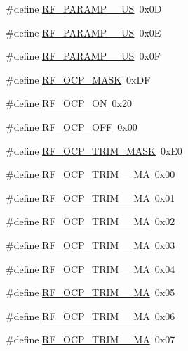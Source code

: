 \begin{DoxyCompactItemize}
\#define \mbox{\hyperlink{sx1276_regs-_fsk_8h_a035bf0812a1b3171b3ca7ccebfe71deb}{R\+F\+\_\+\+P\+A\+R\+A\+M\+P\+\_\+\_\+\+US}}~0x0D
\item 
\#define \mbox{\hyperlink{sx1276_regs-_fsk_8h_abca7fd114ba58b4640c3662519e2c713}{R\+F\+\_\+\+P\+A\+R\+A\+M\+P\+\_\+\_\+\+US}}~0x0E
\item 
\#define \mbox{\hyperlink{sx1276_regs-_fsk_8h_a7863d94d5d9cbd4b3fa8ba21da2c1d2d}{R\+F\+\_\+\+P\+A\+R\+A\+M\+P\+\_\+\_\+\+US}}~0x0F
\item 
\#define \mbox{\hyperlink{sx1276_regs-_fsk_8h_a647861589ac95c5f1dc957e8050efd1c}{R\+F\+\_\+\+O\+C\+P\+\_\+\+M\+A\+SK}}~0x\+DF
\item 
\#define \mbox{\hyperlink{sx1276_regs-_fsk_8h_a88bfe34637e386be3c38ce7ff1a9eed1}{R\+F\+\_\+\+O\+C\+P\+\_\+\+ON}}~0x20
\item 
\#define \mbox{\hyperlink{sx1276_regs-_fsk_8h_adcad32407684d268946ce3928213a966}{R\+F\+\_\+\+O\+C\+P\+\_\+\+O\+FF}}~0x00
\item 
\#define \mbox{\hyperlink{sx1276_regs-_fsk_8h_a01f3bea912fa624b72dc713e92fd4b05}{R\+F\+\_\+\+O\+C\+P\+\_\+\+T\+R\+I\+M\+\_\+\+M\+A\+SK}}~0x\+E0
\item 
\#define \mbox{\hyperlink{sx1276_regs-_fsk_8h_a100553bbc898d5cfcaf0c5f0ee8e1ac1}{R\+F\+\_\+\+O\+C\+P\+\_\+\+T\+R\+I\+M\+\_\+\_\+\+MA}}~0x00
\item 
\#define \mbox{\hyperlink{sx1276_regs-_fsk_8h_ae63185fb50f27713e94bc100dff0f991}{R\+F\+\_\+\+O\+C\+P\+\_\+\+T\+R\+I\+M\+\_\+\_\+\+MA}}~0x01
\item 
\#define \mbox{\hyperlink{sx1276_regs-_fsk_8h_ae614e18d5387cbdda89f9a375f76eac6}{R\+F\+\_\+\+O\+C\+P\+\_\+\+T\+R\+I\+M\+\_\+\_\+\+MA}}~0x02
\item 
\#define \mbox{\hyperlink{sx1276_regs-_fsk_8h_a7ba90fa227a1b2b43ae699d0e89b1ed5}{R\+F\+\_\+\+O\+C\+P\+\_\+\+T\+R\+I\+M\+\_\+\_\+\+MA}}~0x03
\item 
\#define \mbox{\hyperlink{sx1276_regs-_fsk_8h_a71a92d9741db30ff30e3f262438ae62f}{R\+F\+\_\+\+O\+C\+P\+\_\+\+T\+R\+I\+M\+\_\+\_\+\+MA}}~0x04
\item 
\#define \mbox{\hyperlink{sx1276_regs-_fsk_8h_aa66596103d632808f6927635cb4049f1}{R\+F\+\_\+\+O\+C\+P\+\_\+\+T\+R\+I\+M\+\_\+\_\+\+MA}}~0x05
\item 
\#define \mbox{\hyperlink{sx1276_regs-_fsk_8h_a9fc05aaa1ed0f566c01aff24164080aa}{R\+F\+\_\+\+O\+C\+P\+\_\+\+T\+R\+I\+M\+\_\+\_\+\+MA}}~0x06
\item 
\#define \mbox{\hyperlink{sx1276_regs-_fsk_8h_ad91d8ca7ffc7866cec37af6b3cefeb91}{R\+F\+\_\+\+O\+C\+P\+\_\+\+T\+R\+I\+M\+\_\+\_\+\+MA}}~0x07

\end{DoxyCompactItemize}
